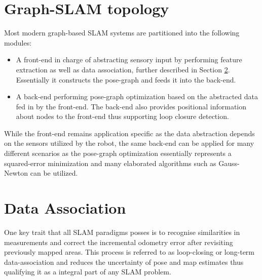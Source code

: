 \section{Graph-SLAM topology}
Most modern graph-based SLAM systems are partitioned into the following modules:
\begin{itemize}
	\item A front-end in charge of abstracting sensory input by performing feature extraction as well as data association, further described in Section \ref{dataAssociation}. Essentially it constructs the pose-graph and feeds it into the back-end.
	\item A back-end performing pose-graph optimization based on the abstracted data fed in by the front-end. The back-end also provides positional information about nodes to the front-end thus supporting loop closure detection. 
\end{itemize}

While the front-end remains application specific as the data abstraction depends on the sensors utilized by the robot, the same back-end can be applied for many different scenarios as the pose-graph optimization essentially represents a squared-error minimization and many elaborated algorithms such as Gauss-Newton can be utilized.


\section{Data Association}\label{dataAssociation}
One key trait that all SLAM paradigms posses is to recognise similarities in measurements and correct the incremental odometry error after revisiting previously mapped areas. This process is referred to as loop-closing or long-term data-association and reduces the uncertainty of pose and map estimates thus qualifying it as a integral part of any SLAM problem. 

